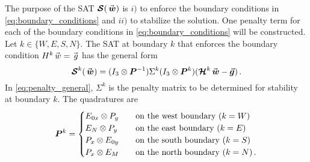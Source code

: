 The purpose of the SAT $\satn(\wn)$ is $i)$ to enforce the boundary conditions in \eqref{eq:boundary_conditions} and $ii)$ to stabilize the solution. 
One penalty term for each of the boundary conditions in \eqref{eq:boundary_conditions} will be constructed. Let $k\in\{W,E,S,N\}$. The SAT at boundary $k$ that enforces the boundary condition $H^k\vecs{w} = \g$ has the general form
\begin{equation}
  \satn^k(\wn) = (I_3\otimes\Pn^{-1})\Sigma^k(I_3\otimes\Pn^{k})(\Hn^k\wn - \vec{\gn})
  \, .
  \label{eq:penalty_general}
\end{equation}
In \eqref{eq:penalty_general}, $\Sigma^k$ is the penalty matrix to be determined for stability at boundary $k$. The quadratures are
\begin{equation*}
	\bm{P}^k = 
	\begin{cases}
    E_{0x}\otimes P_y 	\quad 	& \text{on the west boundary } (k = W)
		\\
    E_N\otimes P_y 	\quad  	& \text{on the east boundary } (k = E)
		\\
    P_x\otimes E_{0y} 	\quad  	& \text{on the south boundary } (k = S)
		\\
		P_x\otimes E_M 	\quad  	& \text{on the north boundary } (k = N)
    \, .
	\end{cases}
\end{equation*}


